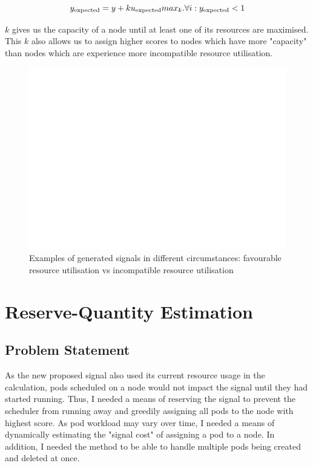 \[ y_{\text{expected}} = y + k u_{\text{expected}} \\
    max_k. \forall i: y_{\text{expected}} < 1 \]

$k$ gives us the capacity of a node until at least one of its resources are
maximised. This $k$ also allows us to assign higher scores to nodes which have
more "capacity" than nodes which are experience more incompatible resource
utilisation.

\begin{figure}[h]
    \centering
    \includegraphics[width=\textwidth]{images/blank.pdf}
    \caption{Examples of generated signals in different circumstances:
    favourable resource utilisation vs incompatible resource utilisation}
    \label{eval-signal}
\end{figure}

\section{Reserve-Quantity Estimation}

\subsection{Problem Statement}
As the new proposed signal also used its current resource usage in the
calculation, pods scheduled on a node would not impact the signal until they had
started running. Thus, I needed a means of reserving the signal to prevent the
scheduler from running away and greedily assigning all pods to the node with
highest score. As pod workload may vary over time, I needed a means of
dynamically estimating the "signal cost" of assigning a pod to a node. In
addition, I needed the method to be able to handle multiple pods being created
and deleted at once.

